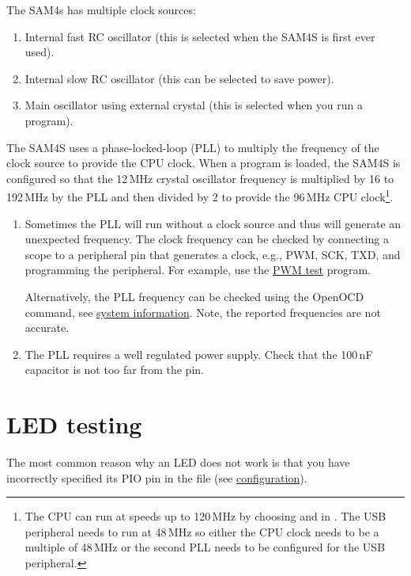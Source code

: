 The SAM4s has multiple clock sources:

\begin{enumerate}
\item
  Internal fast RC oscillator (this is selected when the SAM4S is first
  ever used).
\item
  Internal slow RC oscillator (this can be selected to save power).
\item
  Main oscillator using external crystal (this is selected when you
  run a program).
\end{enumerate}

The SAM4S uses a phase-locked-loop (PLL) to multiply the frequency of
the clock source to provide the CPU clock.  When a program is loaded,
the SAM4S is configured so that the 12\,MHz crystal oscillator
frequency is multiplied by 16 to 192\,MHz by the PLL and then divided
by 2 to provide the 96\,MHz CPU clock\footnote{The CPU can run at
  speeds up to 120\,MHz by choosing  and
   in .  The USB peripheral needs to
  run at 48\,MHz so either the CPU clock needs to be a multiple of
  48\,MHz or the second PLL needs to be configured for the USB
  peripheral.}.

\begin{enumerate}
\item Sometimes the PLL will run without a clock source and thus will
  generate an unexpected frequency.  The clock frequency can be
  checked by connecting a scope to a peripheral pin that generates a
  clock, e.g., PWM, SCK, TXD, and programming the peripheral.  For
  example, use the \hyperref[pwm-test]{PWM test} program.

  Alternatively, the PLL frequency can be checked using the OpenOCD
   command, see
  \hyperref[system-information]{system information}.  Note, the
  reported frequencies are not accurate.

\item The PLL requires a well regulated power supply.  Check that the
  100\,nF capacitor is not too far from the  pin.
\end{enumerate}


\section{LED testing}
\label{debugging-LED}

The most common reason why an LED does not work is that you have
incorrectly specified its PIO pin in the  file (see
\protect\hyperref[configuration]{configuration}).

